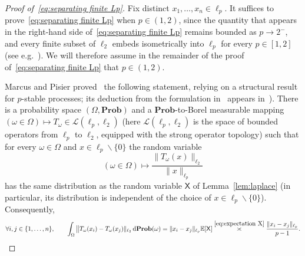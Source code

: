 \documentclass[11pt,reqno]{amsart}
\renewcommand{\setminus}{\smallsetminus}
\newcommand{\ud}[0]{\,\mathrm{d}}
\newcommand{\n}{\{1,\ldots,n\}}
\theoremstyle{remark}
\newcommand{\E}{\mathbb{ E}}
\renewcommand{\Pr}{\mathbf{Prob}}
\renewcommand{\1}{\mathbf 1}
\newcommand{\XX}{\mathsf{X}}
\begin{document}
\begin{proof}[Proof of~\eqref{eq:separating finite Lp}] Fix distinct $x_1,\ldots,x_n\in \ell_p$. It suffices to prove~\eqref{eq:separating finite Lp} when  $p\in (1,2)$, since the quantity that appears in the right-hand side of~\eqref{eq:separating finite Lp} remains bounded as $p\to 2^{-}$, and every finite subset of $\ell_2$ embeds isometrically into $\ell_p$ for every $p\in [1,2]$ (see e.g.~\cite[Chapter~III.A]{Woj91}). We will therefore assume in the remainder of the proof of~\eqref{eq:separating finite Lp}  that $p\in (1,2)$.

Marcus and Pisier proved~\cite[Section~2]{MP84} the following  statement, relying on a structural result for $p$-stable processes; its deduction  from the formulation in~\cite{MP84} appears in~\cite[Lemma~2.1]{LMN05}). There is a probability space $(\Omega,\Pr)$ and a $\Pr$-to-Borel measurable mapping $(\omega\in \Omega)\mapsto T_\omega\in \mathcal{L}({\ell}_p,{\ell}_2)$ (here $\mathcal{L}({\ell}_p,{\ell}_2)$ is the space of bounded operators from ${\ell}_p$ to ${\ell}_2$, equipped with the strong operator topology) such that for every $\omega\in \Omega$ and $x\in {\ell}_p\setminus \{0\}$ the random variable
\begin{equation}\label{eq:X comes from normalized}
(\omega\in \Omega)\mapsto \frac{\|T_\omega(x)\|_{{\ell}_2}}{\|x\|_{{\ell}_p}}
\end{equation}
has the same distribution as the random variable $\XX$ of Lemma~\ref{lem:laplace} (in particular, its distribution is independent of the choice of $x\in {\ell}_p\setminus \{0\}$). Consequently,
\begin{equation}\label{eq:use expectation X}
\forall  i,j\in \n,\qquad  \int_\Omega \big\|T_\omega(x_i)-T_\omega(x_j)\|_{{\ell}_2} \ud\Pr(\omega) =\|x_i-x_j\|_{{\ell}_p} \E[\XX]\stackrel{\eqref{eq:expectation X}}{\asymp} \frac{\|x_i-x_j\|_{{\ell}_p}}{p-1}.
\end{equation}


\end{proof}
\end{document}
